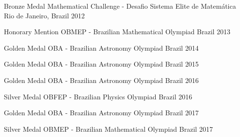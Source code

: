 

\begin{cvhonors}

  \cvhonor
    {Bronze Medal} %
    {Mathematical Challenge - Desafio Sistema Elite de Matemática} %
    {Rio de Janeiro, Brazil} %
    {2012} %

  \cvhonor
    {Honorary Mention} %
    {OBMEP - Brazilian Mathematical Olympiad} %
    {Brazil} %
    {2013} %

  \cvhonor
    {Golden Medal} %
    {OBA - Brazilian Astronomy Olympiad} %
    {Brazil} %
    {2014} %

  \cvhonor
    {Golden Medal} %
    {OBA - Brazilian Astronomy Olympiad} %
    {Brazil} %
    {2015} %

  \cvhonor
    {Golden Medal} %
    {OBA - Brazilian Astronomy Olympiad} %
    {Brazil} %
    {2016} %

  \cvhonor
    {Silver Medal} %
    {OBFEP - Brazilian Physics Olympiad} %
    {Brazil} %
    {2016} %

  \cvhonor
    {Golden Medal} %
    {OBA - Brazilian Astronomy Olympiad} %
    {Brazil} %
    {2017} %

  \cvhonor
    {Silver Medal} %
    {OBMEP - Brazilian Mathematical Olympiad} %
    {Brazil} %
    {2017} %

\end{cvhonors}
